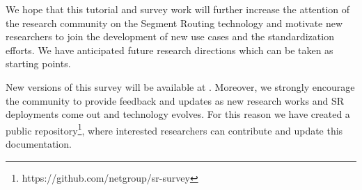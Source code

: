 We hope that this tutorial and survey work will further increase the attention of the research community on the Segment Routing technology and motivate new researchers to join the development of new use cases and the standardization efforts. We have anticipated future research directions which can be taken as starting points.

New versions of this survey will be available at \cite{ventre2019survey}. Moreover, we strongly encourage the community to provide feedback and updates as new research works and SR deployments come out and technology evolves. For this reason we have created a public repository\footnote{https://github.com/netgroup/sr-survey}, where interested researchers can contribute and update this documentation.